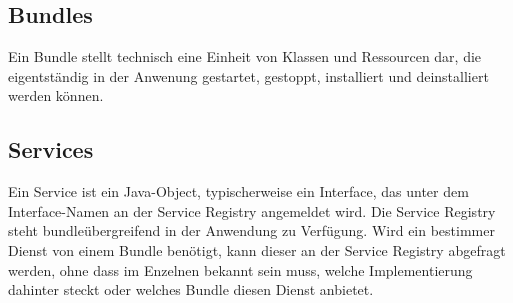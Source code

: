 \subsection{Bundles}
Ein Bundle stellt technisch eine Einheit von Klassen und Ressourcen dar, die
eigentständig in der Anwenung gestartet, gestoppt, installiert und
deinstalliert werden können.
\citep{wtherich_die_2008}
\subsection{Services} %
Ein Service ist ein Java-Object, typischerweise ein Interface, das unter dem
Interface-Namen an der Service Registry angemeldet wird.
Die Service Registry steht bundleübergreifend in der Anwendung zu Verfügung.
Wird ein bestimmer Dienst von einem Bundle benötigt, kann dieser an der Service
Registry abgefragt werden, ohne dass im Enzelnen bekannt sein muss, welche
Implementierung dahinter steckt oder welches Bundle diesen Dienst anbietet.
\citep{wtherich_die_2008}

